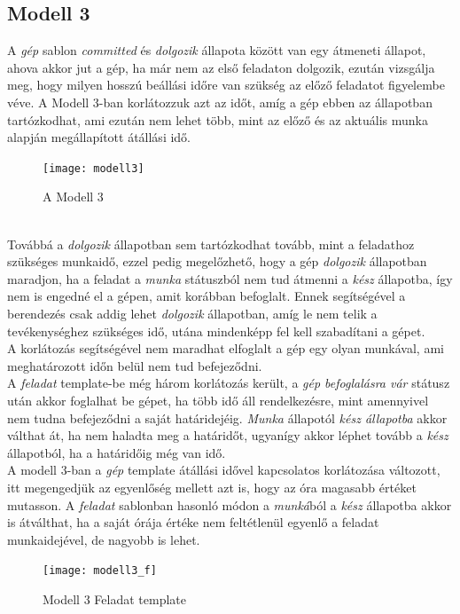 \documentclass {report}
\begin{document}
\subsection{Modell 3}
A \emph{gép} sablon \emph{committed} és \emph{dolgozik} állapota között van egy átmeneti állapot, ahova akkor jut a gép, ha már nem az első feladaton dolgozik, ezután vizsgálja meg, hogy milyen hosszú beállási időre van szükség az előző feladatot figyelembe véve. A Modell 3-ban korlátozzuk azt az időt, amíg a gép ebben az állapotban tartózkodhat, ami ezután nem lehet több, mint az előző és az aktuális munka alapján megállapított átállási idő. \\
 \begin{figure}[htpb]
    \begin{center}
   \texttt{[image: modell3]}\\
    \caption{A Modell 3}
    \end{center}
    \end{figure}\\
Továbbá a \emph{dolgozik} állapotban sem tartózkodhat tovább, mint a feladathoz szükséges munkaidő, ezzel pedig megelőzhető, hogy a gép \emph{dolgozik} állapotban maradjon, ha a feladat a \emph{munka} státuszból nem tud átmenni a \emph{kész} állapotba, így nem is engedné el a gépen, amit korábban befoglalt. Ennek segítségével a berendezés csak addig lehet \emph{dolgozik} állapotban, amíg le nem telik a tevékenységhez szükséges idő, utána mindenképp fel kell szabadítani a gépet.\\
A korlátozás segítségével nem maradhat elfoglalt a gép egy olyan munkával, ami meghatározott időn belül nem tud befejeződni. \\
A \emph{feladat} template-be még három korlátozás került, a \emph{gép befoglalásra vár} státusz után akkor foglalhat be gépet, ha több idő áll rendelkezésre, mint amennyivel nem tudna befejeződni a saját határidejéig. \emph{Munka} állapotól \emph{kész állapotba} akkor válthat át, ha nem haladta meg a határidőt, ugyanígy akkor léphet tovább a \emph{kész} állapotból, ha a határidőig még van idő.\\
A modell 3-ban a \emph{gép} template átállási idővel kapcsolatos korlátozása változott, itt megengedjük az egyenlőség mellett azt is, hogy az óra magasabb értéket mutasson. A \emph{feladat} sablonban hasonló módon a \emph{munká}ból a \emph{kész} állapotba akkor is átválthat, ha a saját órája értéke nem feltétlenül egyenlő a feladat munkaidejével, de nagyobb is lehet.
\begin{figure}[htpb]
    \begin{center}
   \texttt{[image: modell3\_f]}\\
    \caption{Modell 3 Feladat template}
    \end{center}
    \end{figure}
\end{document}
